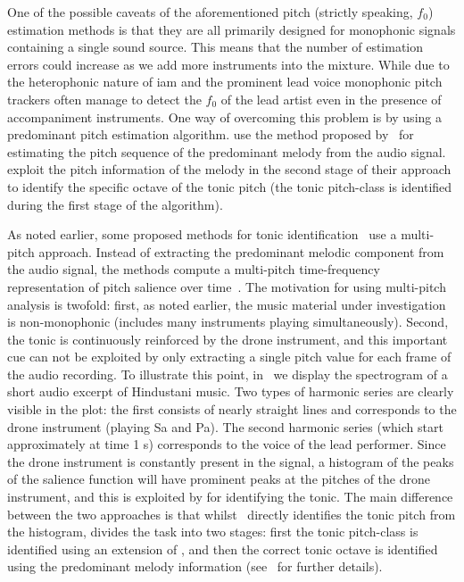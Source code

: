 One of the possible caveats of the aforementioned pitch (strictly speaking, $f_0$) estimation methods is that they are all primarily designed for monophonic signals containing a single sound source. This means that the number of estimation errors could increase as we add more instruments into the mixture. While due to the heterophonic nature of \gls{iam} and the prominent lead voice monophonic pitch trackers often manage to detect the $f_0$ of the lead artist even in the presence of accompaniment instruments. One way of overcoming this problem is by using a predominant pitch estimation algorithm. \cite{gulati2012two} use the method proposed by~\cite{Salamon2012} for estimating the pitch sequence of the predominant melody from the audio signal. \cite{gulati2012two} exploit the pitch information of the melody in the second stage of their approach to identify the specific octave of the tonic pitch (the tonic pitch-class is identified during the first stage of the algorithm).

As noted earlier, some proposed methods for tonic identification~\citep{salamon2012multipitch,gulati2012two} use a multi-pitch approach. Instead of extracting the predominant melodic component from the audio signal, the methods compute a multi-pitch time-frequency representation of pitch salience over time~\citep{Salamon2011}. The motivation for using multi-pitch analysis is twofold: first, as noted earlier, the music material under investigation is non-monophonic (includes many instruments playing simultaneously). Second, the tonic is continuously reinforced by the drone instrument, and this important cue can not be exploited by only extracting a single pitch value for each frame of the audio recording. To illustrate this point, in~ we display the spectrogram of a short audio excerpt of Hindustani music. Two types of harmonic series are clearly visible in the plot: the first consists of nearly straight lines and corresponds to the drone instrument (playing Sa and Pa). The second harmonic series (which start approximately at time 1 s) corresponds to the voice of the lead performer. Since the drone instrument is constantly present in the signal, a histogram of the peaks of the salience function will have prominent peaks at the pitches of the drone instrument, and this is exploited by \cite{salamon2012multipitch,gulati2012two} for identifying the tonic. The main difference between the two approaches is that whilst~\citep{salamon2012multipitch} directly identifies the tonic pitch from the histogram, \cite{gulati2012two} divides the task into two stages: first the tonic pitch-class is identified using an extension of \cite{salamon2012multipitch}, and then the correct tonic octave is identified using the predominant melody information (see~\cite{Gulati2014Tonic} for further details).

